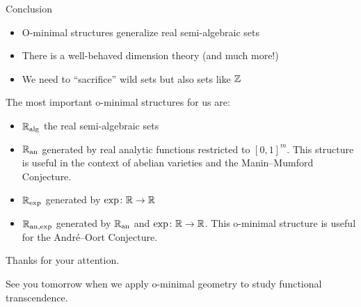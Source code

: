 \documentclass{beamer}
\begin{document}
\begin{frame}{Conclusion}
  \begin{itemize}
  \item O-minimal structures generalize real semi-algebraic sets
  \item There is a well-behaved dimension theory (and much more!)
  \item We need to  ``sacrifice'' wild sets but also sets like ${\mathbb{Z}}$ 
  \end{itemize}
  
  The most important o-minimal structures for us are:
  
  \begin{itemize}
  \item ${\mathbb{R}}_{\mathrm{alg}}$ the real semi-algebraic sets
  \item ${{\mathbb{R}}_{\mathrm{an}}}$ generated by real analytic functions restricted to
    $[0,1]^m$. This structure is useful in the context of abelian
    varieties and the Manin--Mumford Conjecture.
  \item ${{\mathbb{R}}_{\mathrm{exp}}}$ generated by $\exp \colon {\mathbb{R}}\rightarrow{\mathbb{R}}$
  \item ${{\mathbb{R}}_{\mathrm{an,exp}}}$ generated by ${{\mathbb{R}}_{\mathrm{an}}}$ and $\exp \colon
    {\mathbb{R}}\rightarrow{\mathbb{R}}$. This o-minimal structure is useful 
    for the Andr\'e--Oort Conjecture.       
  \end{itemize}  
\end{frame}

\begin{frame}
  \begin{center}
    Thanks for your attention.

    See you tomorrow when we apply o-minimal geometry to study
    functional transcendence.
  \end{center}
\end{frame}
\end{document}
